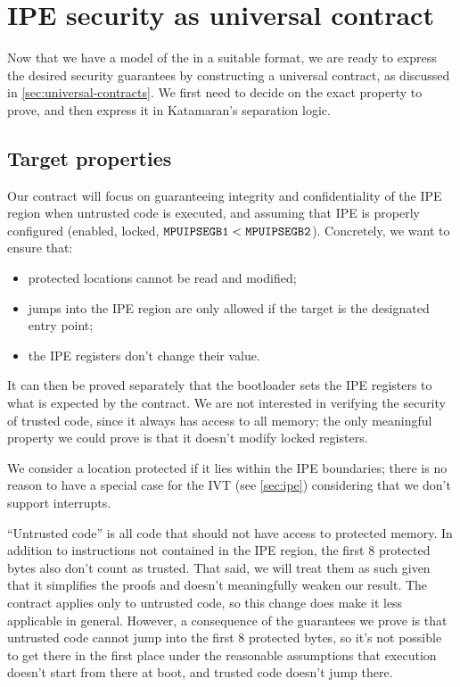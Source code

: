\section{IPE security as universal contract}

Now that we have a model of the \msp in a suitable format, we are ready to express the desired security guarantees by constructing a universal contract, as discussed in \cref{sec:universal-contracts}. We first need to decide on the exact property to prove, and then express it in Katamaran's separation logic.

\subsection{Target properties}
\label{sec:target-properties}

Our contract will focus on guaranteeing integrity and confidentiality of the IPE region when untrusted code is executed, and assuming that IPE is properly configured (\ie enabled, locked, \(\reg{MPUIPSEGB1} < \reg{MPUIPSEGB2}\)). Concretely, we want to ensure that:
\begin{itemize}
\item protected locations cannot be read and modified;
\item jumps into the IPE region are only allowed if the target is the designated entry point;
\item the IPE registers don't change their value.
\end{itemize}

It can then be proved separately that the bootloader sets the IPE registers to what is expected by the contract. We are not interested in verifying the security of trusted code, since it always has access to all memory; the only meaningful property we could prove is that it doesn't modify locked registers.

We consider a location protected if it lies within the IPE boundaries; there is no reason to have a special case for the IVT (see \cref{sec:ipe}) considering that we don't support interrupts.

``Untrusted code'' is all code that should not have access to protected memory. In addition to instructions not contained in the IPE region, the first 8 protected bytes also don't count as trusted. That said, we will treat them as such given that it simplifies the proofs and doesn't meaningfully weaken our result. The contract applies only to untrusted code, so this change does make it less applicable in general. However, a consequence of the guarantees we prove is that untrusted code cannot jump into the first 8 protected bytes, so it's not possible to get there in the first place under the reasonable assumptions that execution doesn't start from there at boot, and trusted code doesn't jump there.

